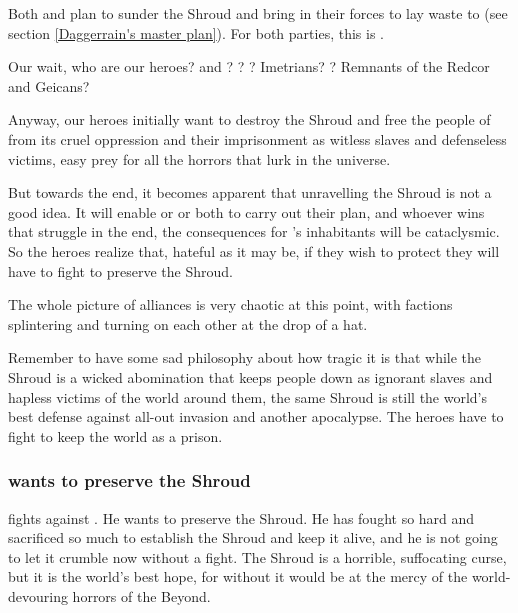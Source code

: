 Both \Daggerrain{} and \Secherdamon{} plan to sunder the Shroud and bring in their forces to lay waste to \Miith{} (see section \ref{Daggerrain's master plan}). For both parties, this is .

Our \prikker wait, who are our heroes? \Narkiza{} and \Dzasselid? \MoroCobrel? \Cuezcans? Imetrians? \Ophidians? Remnants of the Redcor and Geicans?

Anyway, our heroes initially want to destroy the Shroud and free the people of \Miith{} from its cruel oppression and their imprisonment as witless slaves and defenseless victims, easy prey for all the horrors that lurk in the universe.

But towards the end, it becomes apparent that unravelling the Shroud is not a good idea. It will enable \Daggerrain{} or \Secherdamon{} or both to carry out their plan, and whoever wins that struggle in the end, the consequences for \Miith{}'s inhabitants will be cataclysmic. So the heroes realize that, hateful as it may be, if they wish to protect \Miith{} they will have to fight to preserve the Shroud.

The whole picture of alliances is very chaotic at this point, with factions splintering and turning on each other at the drop of a hat.

Remember to have some sad philosophy about how tragic it is that while the Shroud is a wicked abomination that keeps people down as ignorant slaves and hapless victims of the world around them, the same Shroud is still the world's best defense against all-out invasion and another apocalypse. 
The heroes have to fight to keep the world as a prison. 





\subsubsection{\Ishnaruchaefir wants to preserve the Shroud}
\Ishnaruchaefir fights against \Secherdamon.
He wants to preserve the Shroud. 
He has fought so hard and sacrificed so much to establish the Shroud and keep it alive, and he is not going to let it crumble now without a fight. 
The Shroud is a horrible, suffocating curse, but it is the world's best hope, for without it \Miith would be at the mercy of the world-devouring horrors of the Beyond. 

